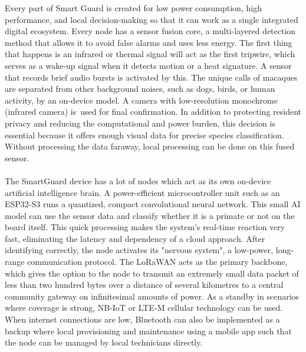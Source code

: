 \documentclass{article}
\begin{document}
Every part of Smart Guard is created for low power consumption, high performance, and local decision-making so that it can work as a single integrated digital ecosystem. Every node has a sensor fusion core, a multi-layered detection method that allows it to avoid false alarms and uses less energy. The first thing that happens is an infrared or thermal signal will act as the first tripwire, which serves as a wake-up signal when it detects motion or a heat signature. A sensor that records brief audio bursts is activated by this. The unique calls of macaques are separated from other background noises, such as dogs, birds, or human activity, by an on-device model. A camera with low-resolution monochrome (infrared camera) is used for final confirmation.  In addition to protecting resident privacy and reducing the computational and power burden, this decision is essential because it offers enough visual data for precise species classification. Without processing the data faraway, local processing can be done on this fused sensor.
\\ \\
The SmartGuard device has a lot of nodes which act as its own on-device artificial intelligence brain. A power-efficient microcontroller unit such as an ESP32-S3 runs a quantized, compact convolutional neural network. This small AI model can use the sensor data and classify whether it is a primate or not on the board itself. This quick processing makes the system's real-time reaction very fast, eliminating the latency and dependency of a cloud approach. After identifying correctly, the node activates its "nervous system", a low-power, long-range communication protocol. The LoRaWAN acts as the primary backbone, which gives the option to the node to transmit an extremely small data packet of less than two hundred bytes over a distance of several kilometres to a central community gateway on infinitesimal amounts of power. As a standby in scenarios where coverage is strong, NB-IoT or LTE-M cellular technology can be used. When internet connections are low, Bluetooth can also be implemented as a backup where local provisioning and maintenance using a mobile app such that the node can be managed by local technicians directly.
\\ \\
\end{document}
